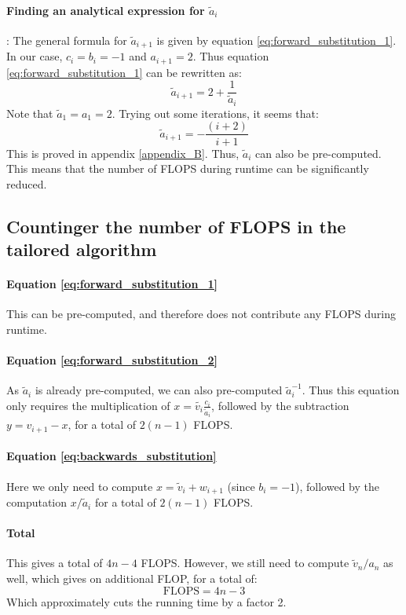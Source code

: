 \documentclass[a4paper, 10pt]{article}
\begin{document}
\paragraph*{Finding an analytical expression for $\tilde{a}_i$}: The general formula for $\tilde{a}_{i+1}$ is given by equation \ref{eq:forward_substitution_1}. In our case, $c_i=b_i=-1$ and $a_{i+1}=2$. Thus equation \ref{eq:forward_substitution_1} can be rewritten as:
\begin{equation}\label{eq:forward_substitution_tailored}
\tilde{a}_{i+1}=2+\frac{1}{\tilde{a}_i}
\end{equation}
Note that $\tilde{a}_1=a_1=2$. Trying out some iterations, it seems that:
\begin{equation}\label{eq:general_an}
\tilde{a}_{i+1}=-\frac{(i+2)}{i+1}
\end{equation}
This is proved in appendix \ref{appendix_B}. Thus, $\tilde{a}_i$ can also be pre-computed. This means that the number of FLOPS during runtime can be significantly reduced.
\newpage
\subsection{Countinger the number of FLOPS in the tailored algorithm}
\paragraph{Equation \ref{eq:forward_substitution_1}} This can be pre-computed, and therefore does not contribute any FLOPS during runtime. 
\paragraph*{Equation \ref{eq:forward_substitution_2}} As $\tilde{a}_i$ is already pre-computed, we can also pre-computed $\tilde{a}_i^{-1}$. Thus this equation only requires the multiplication of $x=\tilde{v_i}\frac{c_i}{\tilde{a}_i}$, followed by the subtraction $y=v_{i+1}-x$, for a total of $2(n-1)$ FLOPS. 
\paragraph*{Equation \ref{eq:backwards_substitution}} Here we only need to compute $x=\tilde{v}_i+w_{i+1}$ (since $b_i=-1$), followed by the computation $x/\tilde{a}_i$ for a total of $2(n-1)$ FLOPS. 
\paragraph*{Total}
This gives a total of $4n-4$ FLOPS. However, we still need to compute $\tilde{v}_n/a_n$ as well, which gives on additional FLOP, for a total of:
$$\mathrm{FLOPS}=4n-3$$
Which approximately cuts the running time by a factor 2. 
\end{document}
